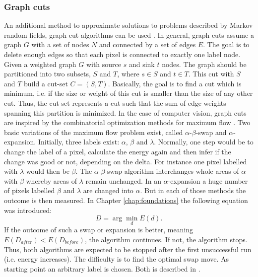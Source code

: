 \subsubsection{Graph cuts}

An additional method to approximate solutions to problems described by Markov random fields, graph cut algorithms can be used \citep{boykov2001fast, cyganek2011introduction}.
In general, graph cuts assume a graph $G$ with a set of nodes $N$ and connected by a set of edges $E$.
The goal is to delete enough edges so that each pixel is connected to exactly one label node.
Given a weighted graph $G$ with source $s$ and sink $t$ nodes.
The graph should be partitioned into two subsets, $S$ and $T$, where $s \in S$ and $t \in T$.
This cut with $S$ and $T$ build a cut-set $C = (S,T)$.
Basically, the goal is to find a cut which is minimum, i.e. if the size or weight of this cut is smaller than the size of any other cut.
Thus, the cut-set represents a cut such that the sum of edge weights spanning this partition is minimized.
\newline\newline\noindent In the case of computer vision, graph cuts are inspired by the combinatorial optimization methods for maximum flow \citep{cyganek2011introduction, cormen2009introduction}.
Two basic variations of the maximum flow problem exist, called $\alpha$-$\beta$-swap and $\alpha$-expansion.
Initially, three labels exist: $\alpha$, $\beta$ and $\lambda$. 
Normally, one step would be to change the label of a pixel, calculate the energy again and then infer if the change was good or not, depending on the delta.
For instance one pixel labelled with $\lambda$ would then be $\beta$.
The $\alpha$-$\beta$-swap algorithm interchanges whole areas of $\alpha$ with $\beta$ whereby areas of $\lambda$ remain unchanged.
In an $\alpha$-expansion a huge number of pixels labelled $\beta$ and $\lambda$ are changed into $\alpha$.
But in each of those methods the outcome is then measured.
In Chapter \ref{chap:foundations} the following equation was introduced:
\begin{equation}
  D = \arg\min_{d} E(d).
\end{equation}
\noindent If the outcome of such a swap or expansion is better, meaning $E(D_{after}) < E(D_{before})$, the algorithm continues.
If not, the algorithm stops.
Thus, both algorithms are expected to be stopped after the first unsuccessful run (i.e. energy increases).
The difficulty is to find the optimal swap move.
As starting point an arbitrary label is chosen.
Both is described in \citep{boykov2001fast, sinha2004graph, tappen2003comparison, ramin2004energy}.


